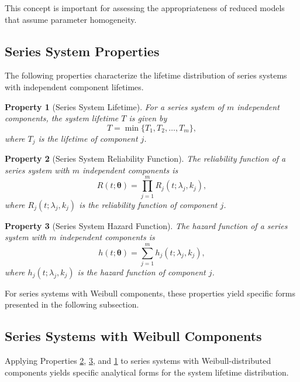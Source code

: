 \documentclass[11pt]{article}
\renewcommand{\v}[1]{\boldsymbol{#1}}
\newtheorem{property}{Property}[section]
\begin{document}
This concept is important for assessing the appropriateness of reduced models that assume parameter homogeneity.

\subsection{Series System Properties}

The following properties characterize the lifetime distribution of series systems with independent component lifetimes.

\begin{property}[Series System Lifetime]
\label{prop:sys_lifetime}
For a series system of $m$ independent components, the system lifetime $T$ is given by
$$
T = \min\{T_1, T_2, \ldots, T_m\},
$$
where $T_j$ is the lifetime of component $j$.
\end{property}

\begin{property}[Series System Reliability Function]
\label{prop:sys_reliability_function}
The reliability function of a series system with $m$ independent components is
$$
R(t; \v\theta) = \prod_{j=1}^{m} R_j(t; \lambda_j, k_j),
$$
where $R_j(t; \lambda_j, k_j)$ is the reliability function of component $j$.
\end{property}

\begin{property}[Series System Hazard Function]
\label{prop:sys_failure_rate}
The hazard function of a series system with $m$ independent components is
$$
h(t; \v\theta) = \sum_{j=1}^{m} h_j(t; \lambda_j, k_j),
$$
where $h_j(t; \lambda_j, k_j)$ is the hazard function of component $j$.
\end{property}

For series systems with Weibull components, these properties yield specific forms presented in the following subsection.

\subsection{Series Systems with Weibull Components}

Applying Properties \ref{prop:sys_reliability_function}, \ref{prop:sys_failure_rate}, and \ref{prop:sys_lifetime} to series systems with Weibull-distributed components yields specific analytical forms for the system lifetime distribution.
\end{document}
